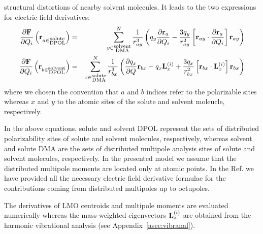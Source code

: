 \documentclass[a4paper,titlepage,twoside,fleqn,12pt]{book}
\newcommand{\fderiv}[2]{\ensuremath{
\frac{\partial #1}{\partial #2}}}
\begin{document}
\begin{refsection}
structural distortions of nearby solvent molecules. 
It leads to the two expressions for electric field derivatives:
%
\begin{eqnarray}
\fderiv{{\bf F}}{Q_i} \left({\bf r}_{a\in\substack{\text{solute}\\\text{DPOL}}} \right)
   &=& \sum_{y\in\substack{\text{solvent}\\\text{DMA}}}^N \frac{1}{r_{ay}^3}  
        \left(
                q_y \fderiv{{\bf r}_{a}}{Q_i} - \frac{3q_y}{r_{ay}^2} 
                \left[ 
                     {\bf r}_{ay} \cdot \fderiv{{\bf r}_{a}}{Q_i} 
                \right] {\bf r}_{ay}
        \right) \\
%
\fderiv{{\bf F}}{Q_i} \left({\bf r}_{b\in\substack{\text{solvent}\\\text{DPOL}}} \right)
    &=& \sum_{x\in\substack{\text{solute}\\\text{DMA}}}^N \frac{1}{r_{bx}^3}  
        \left(
            \fderiv{q_x}{Q}{\bf r}_{bx} - q_x {\bf L}_x^{(i)} + \frac{3q_x}{r_{bx}^2} 
                \left[ 
                     {\bf r}_{bx} \cdot {\bf L}_x^{(i)}
                \right] {\bf r}_{bx}
        \right)
\end{eqnarray}
%
where we chosen the convention that $a$ and $b$ indices refer to the 
polarizable sites whereas $x$ and $y$ to the atomic sites of the solute
and solvent moleucle, respectively.

In the above equations, solute and solvent DPOL represent the sets 
of distributed polarizability sites of solute and solvent molecules, 
respectively, whereas solvent and solute DMA are the sets of distributed 
multipole analysis sites of solute and solvent molecules, respectively. 
In the presented model we assume that the distributed multipole moments are located only at atomic points.
In the Ref.\citep{Blasiak.Cho.JCP.2014} we have provided all the 
necessary electric field derivative formulae for the contributions
coming from distributed multipoles up to octupoles. 

The derivatives of LMO centroids and multipole moments are evaluated numerically whereas 
the mass\hyp{}weighted eigenvectors
${\bf L}_x^{(i)}$ 
are obtained from the harmonic vibrational analysis (see Appendix~\ref{asec:vibranal}).


\end{refsection}
\end{document}
